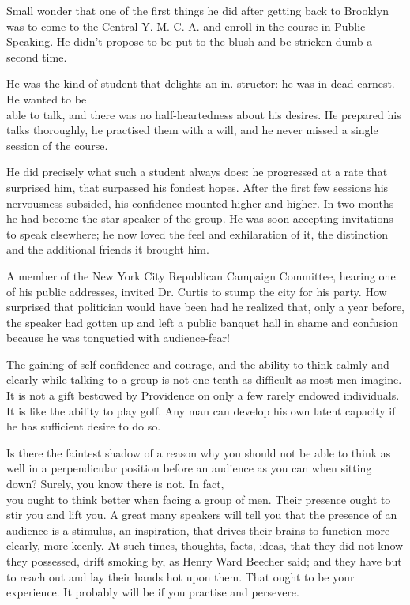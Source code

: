 \documentclass[10pt]{article}
\begin{document}
Small wonder that one of the first things he did after getting back to Brooklyn was to come to the Central Y. M. C. A. and enroll in the course in Public Speaking. He didn't propose to be put to the blush and be stricken dumb a second time.

He was the kind of student that delights an in. structor: he was in dead earnest. He wanted to be\\
able to talk, and there was no half-heartedness about his desires. He prepared his talks thoroughly, he practised them with a will, and he never missed a single session of the course.

He did precisely what such a student always does: he progressed at a rate that surprised him, that surpassed his fondest hopes. After the first few sessions his nervousness subsided, his confidence mounted higher and higher. In two months he had become the star speaker of the group. He was soon accepting invitations to speak elsewhere; he now loved the feel and exhilaration of it, the distinction and the additional friends it brought him.

A member of the New York City Republican Campaign Committee, hearing one of his public addresses, invited Dr. Curtis to stump the city for his party. How surprised that politician would have been had he realized that, only a year before, the speaker had gotten up and left a public banquet hall in shame and confusion because he was tonguetied with audience-fear!

The gaining of self-confidence and courage, and the ability to think calmly and clearly while talking to a group is not one-tenth as difficult as most men imagine. It is not a gift bestowed by Providence on only a few rarely endowed individuals. It is like the ability to play golf. Any man can develop his own latent capacity if he has sufficient desire to do so.

Is there the faintest shadow of a reason why you should not be able to think as well in a perpendicular position before an audience as you can when sitting down? Surely, you know there is not. In fact,\\
you ought to think better when facing a group of men. Their presence ought to stir you and lift you. A great many speakers will tell you that the presence of an audience is a stimulus, an inspiration, that drives their brains to function more clearly, more keenly. At such times, thoughts, facts, ideas, that they did not know they possessed, drift smoking by, as Henry Ward Beecher said; and they have but to reach out and lay their hands hot upon them. That ought to be your experience. It probably will be if you practise and persevere.
\end{document}
